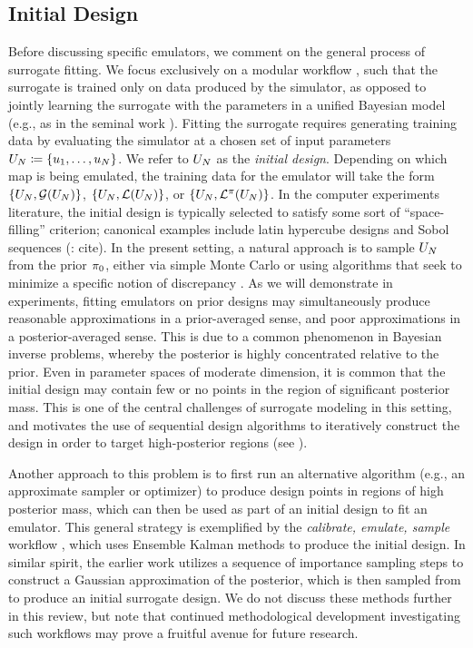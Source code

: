 \documentclass[12pt]{article}
\begin{document}
\subsection{Initial Design}
Before discussing specific emulators, we comment on the general process of surrogate fitting.
We focus exclusively on a modular workflow \citep{modularization}, such that the surrogate is
 trained only on data produced
by the simulator, as opposed to jointly learning the surrogate with the parameters in a 
unified Bayesian model (e.g., as in the seminal work \citet{KOH}). Fitting the surrogate requires 
generating training data by evaluating the simulator at a chosen set of input parameters
$U_{N} \coloneqq \{u_1, \dots, u_{N}\}$. We refer to $U_{N}$ as the \textit{initial design}.
Depending on which map is being emulated, the training data for the emulator will take the form 
$\{U_{N}, \mathcal{G}(U_{N})\}$, $\{U_{N}, \mathcal{L}(U_{N})\}$, or $\{U_{N}, \mathcal{L}^{\pi}(U_{N})\}$. 
In the computer experiments literature, 
the initial design is typically selected to satisfy some sort of ``space-filling'' criterion; canonical examples 
include latin hypercube designs and Sobol sequences (\todo: cite). In the present setting, a natural 
approach is to sample $U_{N}$ from the prior $\pi_0$, either via simple Monte Carlo or using 
algorithms that seek to minimize a specific notion of discrepancy \citep{supportPoints, SteinPoints}.
As we will demonstrate in experiments, fitting emulators on prior designs may simultaneously produce 
reasonable approximations in a prior-averaged sense, and poor approximations in a posterior-averaged
sense. This is due to a common phenomenon in Bayesian inverse problems, whereby the posterior is highly 
concentrated relative to the prior. Even in parameter spaces of moderate dimension, it is common that 
the initial design may contain few or no points in the region of significant posterior mass. This is one of the
central challenges of surrogate modeling in this setting, and motivates the use of sequential design algorithms
to iteratively construct the design in order to target high-posterior regions (see ).

Another approach to this problem is to first run an alternative algorithm (e.g., an approximate 
sampler or optimizer) to produce design points in regions of high posterior mass, which can then 
be used as part of an initial design to fit an emulator. This general strategy is exemplified by the 
\textit{calibrate, emulate, sample} workflow \citep{CES,idealizedGCM,CESSoftware,FATES_CES}, 
which uses Ensemble Kalman methods to produce the initial design. In similar spirit, the earlier work 
\citet{emPostDens} utilizes a sequence of importance sampling steps to construct a Gaussian 
approximation of the posterior, which is then sampled from to produce an initial surrogate design.
We do not discuss these methods further in this review, but note that continued methodological 
development investigating such workflows may prove a fruitful avenue for future research. 
\end{document}
